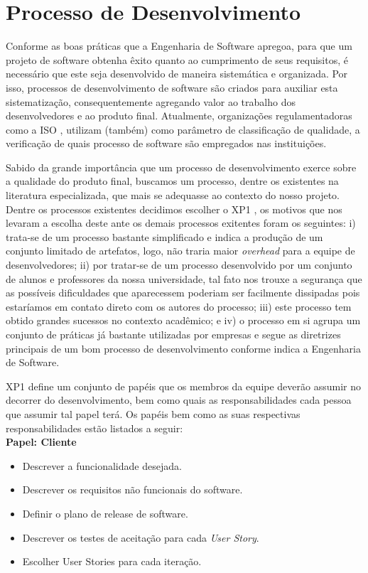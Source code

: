 \chapter{Processo de Desenvolvimento}

Conforme as boas práticas que a Engenharia de Software apregoa, para que um projeto de software obtenha êxito quanto ao cumprimento de seus requisitos, é necessário que este seja desenvolvido de maneira sistemática e organizada. Por isso, processos de desenvolvimento de software são criados para auxiliar esta sistematização, consequentemente agregando valor ao trabalho dos desenvolvedores e ao produto final. Atualmente, organizações regulamentadoras como a ISO \cite{iso}, utilizam (também) como parâmetro de classificação de qualidade, a verificação de quais processo de software são empregados nas instituições.

Sabido da grande importância que um processo de desenvolvimento exerce sobre a qualidade do produto final, buscamos um processo, dentre os existentes na literatura especializada, que mais se adequasse ao contexto do nosso projeto. Dentre os processos existentes decidimos escolher o XP1 \cite{xp1}, os motivos que nos levaram a escolha deste ante os demais processos exitentes foram os seguintes: i) trata-se de um processo bastante simplificado e indica a produção de um conjunto limitado de artefatos, logo, não traria maior \textit{overhead} para a equipe de desenvolvedores; ii) por tratar-se de um processo desenvolvido por um conjunto de alunos e professores da nossa universidade, tal fato nos trouxe a segurança que as possíveis dificuldades que aparecessem poderiam ser facilmente dissipadas pois estaríamos em contato direto com os autores do processo; iii) este processo tem obtido grandes sucessos no contexto acadêmico; e iv) o processo em si agrupa um conjunto de práticas já bastante utilizadas por empresas e segue as diretrizes principais de um bom processo de desenvolvimento conforme indica a Engenharia de Software.

XP1 define um conjunto de papéis que os membros da equipe deverão assumir no decorrer do desenvolvimento, bem como quais as responsabilidades  cada pessoa que assumir tal papel terá. Os papéis bem como as suas respectivas responsabilidades estão listados a seguir: \\

\textbf{Papel: Cliente}
\begin{itemize}
 \item Descrever a funcionalidade desejada.
 \item Descrever os requisitos não funcionais do software.
 \item Definir o plano de release de software.
 \item Descrever os testes de aceitação para cada \textit{User Story}.
 \item Escolher User Stories para cada iteração.
\end{itemize}

